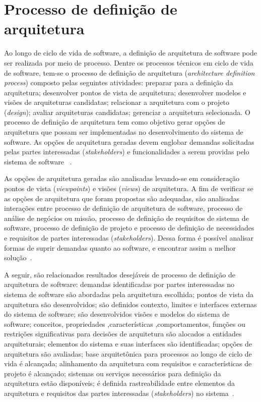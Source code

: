 \section{Processo de definição de arquitetura}

Ao longo de ciclo de vida de software, a definição de arquitetura de software pode ser realizada por meio de processo. Dentre os processos técnicos em ciclo de vida de software, tem-se o processo de definição de arquitetura (\emph{architecture definition process}) composto pelas seguintes atividades: preparar para a definição da arquitetura; desenvolver pontos de vista de arquitetura; desenvolver modelos e visões de arquiteturas candidatas; relacionar a arquitetura com o projeto (\emph{design}); avaliar arquiteturas candidatas; gerenciar a arquitetura selecionada. O processo de definição de arquitetura tem como objetivo gerar opções de arquitetura que possam ser implementadas no desenvolvimento do sistema de software. As opções de arquitetura geradas devem englobar demandas solicitadas pelas partes interessadas (\emph{stakeholders}) e funcionalidades a serem providas pelo sistema de software ~\cite{ISO_12207}.

As opções de arquitetura geradas são analisadas levando-se em consideração pontos de vista (\emph{viewpoints}) e visões (\emph{views}) de arquitetura. A fim de verificar se as opções de arquitetura que foram propostas são adequadas, são analisadas interações entre processo de definição de arquitetura de software, processo de análise de negócios ou missão, processo de definição de requisitos de sistema de software, processo de definição de projeto e processo de definição de necessidades e requisitos de partes interessadas (\emph{stakeholders}). Dessa forma é possível analisar formas de suprir demandas quanto ao software, e encontrar assim a melhor solução~\cite{ISO_12207}. 

A seguir, são relacionados resultados desejáveis de processo de definição de arquitetura de software: demandas identificadas por partes interessadas no sistema de software são abordadas pela arquitetura escolhida; pontos de vista da arquitetura são desenvolvidos; são definidos contexto, limites e interfaces externas do sistema de software; são desenvolvidos visões e modelos do sistema de software; 
conceitos, propriedades ,características ,comportamentos, 
funções ou restrições significativas para decisões de arquitetura são alocados a entidades arquiteturais; elementos do sistema e suas interfaces são identificadas; opções de arquitetura são avaliadas; base arquitetônica para processos ao longo de ciclo de vida é alcançada; 
alinhamento da arquitetura com requisitos e características de projeto é alcançado; sistemas ou serviços necessários para definição da arquitetura estão disponíveis; 
é definida rastreabilidade entre elementos da arquitetura e requisitos das partes interessadas (\emph{stakeholders}) no sistema~\cite{ISO_12207}.  

